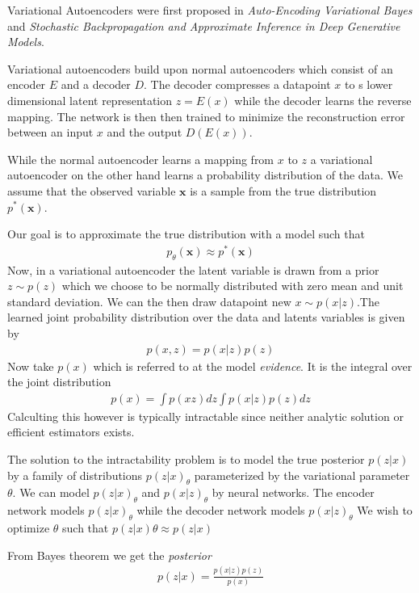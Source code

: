 Variational Autoencoders were first proposed in \textit{Auto-Encoding Variational Bayes} \cite{vae1} and \textit{Stochastic Backpropagation and Approximate Inference in Deep Generative Models}. \cite{vae2}

Variational autoencoders build upon normal autoencoders which consist of an encoder $E$ and a decoder $D$. The decoder compresses a datapoint $x$ to s lower dimensional latent representation $z = E(x)$ while the decoder learns the reverse mapping. The network is then then trained to minimize the reconstruction error between an input $x$ and the output $D(E(x))$.

While the normal autoencoder learns a mapping from $x$ to $z$ a variational autoencoder on the other hand learns a probability distribution of the data.
We assume that the observed variable $\mathbf{x}$ is a sample from the true distribution $p^*(\mathbf{x})$.\cite{vaeintro}

Our goal is to approximate the true distribution with a model such that
\begin{align}
  p_\theta(\mathbf{x})\approx p^*(\mathbf{x})
\end{align}
Now, in a variational autoencoder the latent variable is drawn from a prior $z\sim p(z)$ which we choose to be normally distributed with zero mean and unit standard deviation. We can the then draw datapoint new $x\sim p(x|z)$.The learned joint probability distribution over the data and latents variables is given by
\begin{align}
    p(x,z)=p(x|z)p(z)
\end{align}
Now take $p(x)$ which is referred to at the model \emph{evidence}. It is the integral over the joint distribution
\begin{align}
    p(x)= \int p(xz)dz \int p(x|z) p(z)dz
    \label{evidence}
\end{align}
Calculting this however is typically intractable since neither analytic solution or efficient estimators exists. \cite{vaeintro}

The solution to the intractability problem is to model the true posterior $p(z|x)$ by a family of distributions $p(z|x)_\theta$ parameterized by the variational parameter $\theta$. We can model $p(z|x)_\theta$ and $p(x|z)_\theta$ by neural networks. The encoder network models $p(z|x)_\theta$ while the decoder network models $p(x|z)_\theta$ We wish to optimize $\theta$ such that $p(z|x)\theta \approx p(z|x)$

From Bayes theorem we get the \emph{posterior}
\begin{align}
    p(z|x) =\frac{p(x|z)p(z)}{p(x)}
\end{align}

